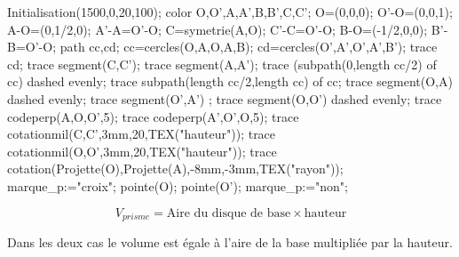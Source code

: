     \begin{propriete}
        \begin{minipage}{0.2\linewidth}
            \begin{Geometrie}[CoinBG={u*(-10,-10)},TypeTrace="Espace"]
                Initialisation(1500,0,20,100);
                color O,O',A,A',B,B',C,C';
                O=(0,0,0);
                O'-O=(0,0,1);
                A-O=(0,1/2,0);
                A'-A=O'-O;
                C=symetrie(A,O);
                C'-C=O'-O;
                B-O=(-1/2,0,0);
                B'-B=O'-O;
                path cc,cd;
                cc=cercles(O,A,O,A,B);
                cd=cercles(O',A',O',A',B');
                trace cd;
                trace segment(C,C');
                trace segment(A,A');
                trace (subpath(0,length cc/2) of cc) dashed evenly;
                trace subpath(length cc/2,length cc) of cc;
                trace segment(O,A) dashed evenly;
                trace segment(O',A') ;
                trace segment(O,O') dashed evenly;
                trace codeperp(A,O,O',5);
                trace codeperp(A',O',O,5);
                trace cotationmil(C,C',3mm,20,TEX("hauteur"));
                trace cotationmil(O,O',3mm,20,TEX("hauteur"));
                trace cotation(Projette(O),Projette(A),-8mm,-3mm,TEX("rayon"));
                marque_p:="croix";
                pointe(O);
                pointe(O');
                marque_p:="non";
            \end{Geometrie}
        \end{minipage}
        \hfill
        \begin{minipage}{0.75\linewidth}
            $$V_{prisme}=\text{Aire du disque de base}\times \text{hauteur}$$
        \end{minipage}
    \end{propriete}
    \begin{remarque}
        Dans les deux cas le volume est égale à l'aire de la base multipliée par la hauteur.
    \end{remarque}
